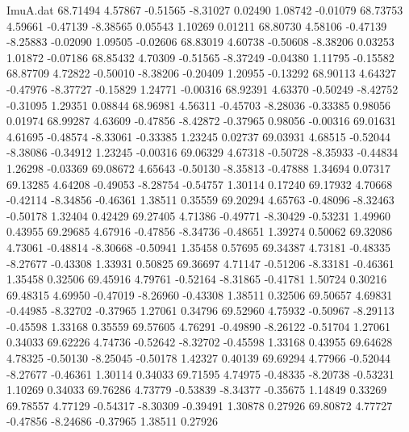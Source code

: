 \begin{filecontents}{ImuA.dat}
  68.71494    4.57867   -0.51565   -8.31027    0.02490    1.08742   -0.01079
  68.73753    4.59661   -0.47139   -8.38565    0.05543    1.10269    0.01211
  68.80730    4.58106   -0.47139   -8.25883   -0.02090    1.09505   -0.02606
  68.83019    4.60738   -0.50608   -8.38206    0.03253    1.01872   -0.07186
  68.85432    4.70309   -0.51565   -8.37249   -0.04380    1.11795   -0.15582
  68.87709    4.72822   -0.50010   -8.38206   -0.20409    1.20955   -0.13292
  68.90113    4.64327   -0.47976   -8.37727   -0.15829    1.24771   -0.00316
  68.92391    4.63370   -0.50249   -8.42752   -0.31095    1.29351    0.08844
  68.96981    4.56311   -0.45703   -8.28036   -0.33385    0.98056    0.01974
  68.99287    4.63609   -0.47856   -8.42872   -0.37965    0.98056   -0.00316
  69.01631    4.61695   -0.48574   -8.33061   -0.33385    1.23245    0.02737
  69.03931    4.68515   -0.52044   -8.38086   -0.34912    1.23245   -0.00316
  69.06329    4.67318   -0.50728   -8.35933   -0.44834    1.26298   -0.03369
  69.08672    4.65643   -0.50130   -8.35813   -0.47888    1.34694    0.07317
  69.13285    4.64208   -0.49053   -8.28754   -0.54757    1.30114    0.17240
  69.17932    4.70668   -0.42114   -8.34856   -0.46361    1.38511    0.35559
  69.20294    4.65763   -0.48096   -8.32463   -0.50178    1.32404    0.42429
  69.27405    4.71386   -0.49771   -8.30429   -0.53231    1.49960    0.43955
  69.29685    4.67916   -0.47856   -8.34736   -0.48651    1.39274    0.50062
  69.32086    4.73061   -0.48814   -8.30668   -0.50941    1.35458    0.57695
  69.34387    4.73181   -0.48335   -8.27677   -0.43308    1.33931    0.50825
  69.36697    4.71147   -0.51206   -8.33181   -0.46361    1.35458    0.32506
  69.45916    4.79761   -0.52164   -8.31865   -0.41781    1.50724    0.30216
  69.48315    4.69950   -0.47019   -8.26960   -0.43308    1.38511    0.32506
  69.50657    4.69831   -0.44985   -8.32702   -0.37965    1.27061    0.34796
  69.52960    4.75932   -0.50967   -8.29113   -0.45598    1.33168    0.35559
  69.57605    4.76291   -0.49890   -8.26122   -0.51704    1.27061    0.34033
  69.62226    4.74736   -0.52642   -8.32702   -0.45598    1.33168    0.43955
  69.64628    4.78325   -0.50130   -8.25045   -0.50178    1.42327    0.40139
  69.69294    4.77966   -0.52044   -8.27677   -0.46361    1.30114    0.34033
  69.71595    4.74975   -0.48335   -8.20738   -0.53231    1.10269    0.34033
  69.76286    4.73779   -0.53839   -8.34377   -0.35675    1.14849    0.33269
  69.78557    4.77129   -0.54317   -8.30309   -0.39491    1.30878    0.27926
  69.80872    4.77727   -0.47856   -8.24686   -0.37965    1.38511    0.27926

\end{filecontents}
